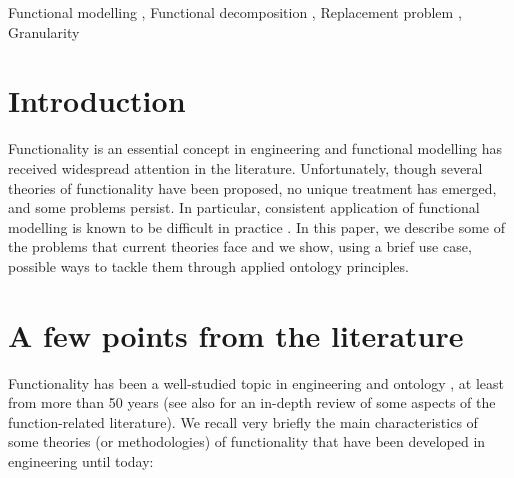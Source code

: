 \documentclass[
]{ceurart}
\begin{document}
\begin{keywords}
  Functional modelling \sep
  Functional decomposition \sep
  Replacement problem \sep
  Granularity
\end{keywords}

\maketitle


\section{Introduction}
    
Functionality is an essential concept in engineering and functional modelling has received widespread attention in the literature. 
Unfortunately, though several theories of functionality have been proposed, no unique treatment has emerged, and some problems persist. In particular, consistent application of functional modelling is known to be difficult in practice \cite{eckertThatWhichNot2013}.
In this paper, we describe some of the problems that current theories face and we show, using a brief use case, possible ways to tackle them through applied ontology principles. 

\section{A few points from the literature}\label{sec:literature}

Functionality has been a well-studied topic in engineering \cite{chandrasekaranFunctionalRepresentationDesign1993, umedaFunctionBehaviourStructure1990, hirtz_functional_2002} and ontology \cite{sasajimaFBRLFunctionBehavior1995, TowardAUnifiedDefinition2012}, at least from more than 50 years \cite{collinsFailureExperienceMatrixUseful1976,pahl_engineering_2007} (see also \cite{erdenReviewFunctionModeling2008} for an in-depth review of some aspects of the function-related literature).
We recall very briefly the main characteristics of some theories (or methodologies) of functionality that have been developed in engineering until today:
\end{document}
